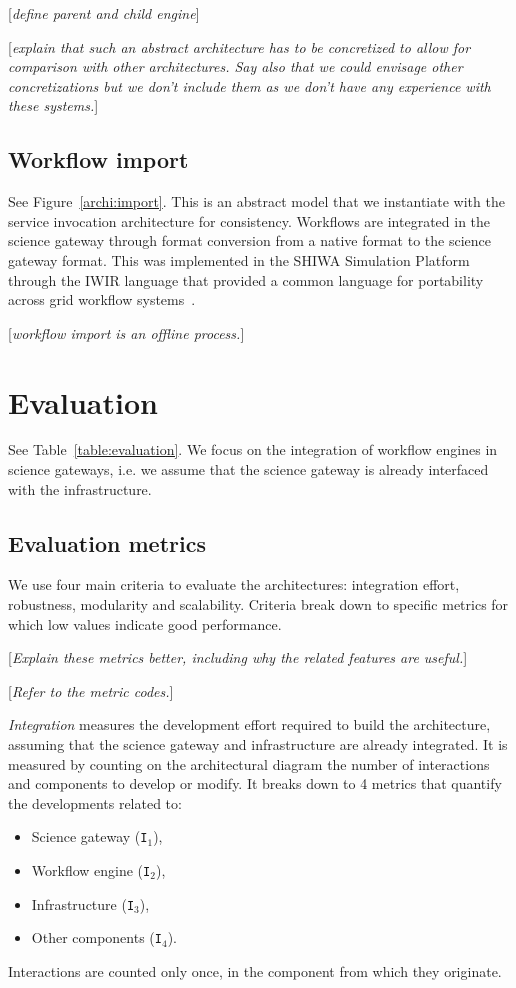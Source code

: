 \documentclass[preprint,3p,twocolumn]{elsarticle}
\newcommand{\todo}[1]{\color{blue}\xspace[\emph{#1}]\xspace\color{black}}
\begin{document}
\todo{define parent and child engine}

\todo{explain that such an abstract architecture has to be concretized to allow for comparison with other architectures. Say also that we could envisage other concretizations but we don't include them as we don't have any experience with these systems.} 

\subsection{Workflow import}

See Figure~\ref{archi:import}. This is an abstract model that we
instantiate with the service invocation architecture for
consistency. Workflows are integrated in the science gateway through
format conversion from a native format to the science gateway
format. This was implemented in the SHIWA Simulation Platform through
the IWIR language that provided a common language for portability
across grid workflow
systems~\cite{plankensteiner-prodan-etal:2013}.

\todo{workflow import is an offline process.}

\section{Evaluation}

See Table~\ref{table:evaluation}. We focus on the integration of
workflow engines in science gateways, i.e. we assume that the science
gateway is already interfaced with the infrastructure.

\subsection{Evaluation metrics}

We use four main criteria to evaluate the architectures: integration
effort, robustness, modularity and scalability. Criteria break down to
specific metrics for which low values indicate good performance.

\todo{Explain these metrics better, including why the related features
  are useful.}

\todo{Refer to the metric codes.}

\emph{Integration} measures the development effort required to build
the architecture, assuming that the science gateway and infrastructure
are already integrated. It is measured by counting on the
architectural diagram the number of interactions and components to
develop or modify. It breaks down to 4 metrics that quantify the
developments related to:
\begin{itemize}[itemsep=0cm]
\item Science gateway (\texttt{I$_1$}),
\item Workflow engine (\texttt{I$_2$}),
\item Infrastructure (\texttt{I$_3$}),
\item Other components (\texttt{I$_4$}).
\end{itemize}
Interactions are counted only once, in the component from which they
originate.
\end{document}
